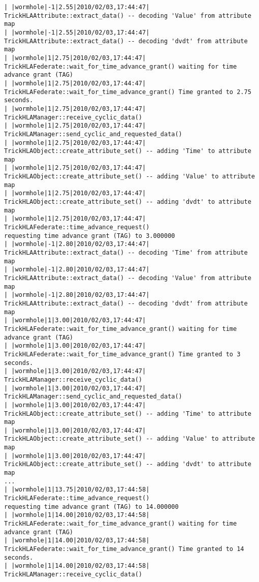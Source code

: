 \begin{lstlisting}[numbers=none,caption={output showing conditionally sent cyclic data}]
| |wormhole|-1|2.55|2010/02/03,17:44:47| TrickHLAAttribute::extract_data() -- decoding 'Value' from attribute map
| |wormhole|-1|2.55|2010/02/03,17:44:47| TrickHLAAttribute::extract_data() -- decoding 'dvdt' from attribute map
| |wormhole|1|2.75|2010/02/03,17:44:47| TrickHLAFederate::wait_for_time_advance_grant() waiting for time advance grant (TAG)
| |wormhole|1|2.75|2010/02/03,17:44:47| TrickHLAFederate::wait_for_time_advance_grant() Time granted to 2.75 seconds.
| |wormhole|1|2.75|2010/02/03,17:44:47| TrickHLAManager::receive_cyclic_data()
| |wormhole|1|2.75|2010/02/03,17:44:47| TrickHLAManager::send_cyclic_and_requested_data()
| |wormhole|1|2.75|2010/02/03,17:44:47| TrickHLAObject::create_attribute_set() -- adding 'Time' to attribute map
| |wormhole|1|2.75|2010/02/03,17:44:47| TrickHLAObject::create_attribute_set() -- adding 'Value' to attribute map
| |wormhole|1|2.75|2010/02/03,17:44:47| TrickHLAObject::create_attribute_set() -- adding 'dvdt' to attribute map
| |wormhole|1|2.75|2010/02/03,17:44:47| TrickHLAFederate::time_advance_request()   
requesting time advance grant (TAG) to 3.000000
| |wormhole|-1|2.80|2010/02/03,17:44:47| TrickHLAAttribute::extract_data() -- decoding 'Time' from attribute map
| |wormhole|-1|2.80|2010/02/03,17:44:47| TrickHLAAttribute::extract_data() -- decoding 'Value' from attribute map
| |wormhole|-1|2.80|2010/02/03,17:44:47| TrickHLAAttribute::extract_data() -- decoding 'dvdt' from attribute map
| |wormhole|1|3.00|2010/02/03,17:44:47| TrickHLAFederate::wait_for_time_advance_grant() waiting for time advance grant (TAG)
| |wormhole|1|3.00|2010/02/03,17:44:47| TrickHLAFederate::wait_for_time_advance_grant() Time granted to 3 seconds.
| |wormhole|1|3.00|2010/02/03,17:44:47| TrickHLAManager::receive_cyclic_data()
| |wormhole|1|3.00|2010/02/03,17:44:47| TrickHLAManager::send_cyclic_and_requested_data()
| |wormhole|1|3.00|2010/02/03,17:44:47| TrickHLAObject::create_attribute_set() -- adding 'Time' to attribute map
| |wormhole|1|3.00|2010/02/03,17:44:47| TrickHLAObject::create_attribute_set() -- adding 'Value' to attribute map
| |wormhole|1|3.00|2010/02/03,17:44:47| TrickHLAObject::create_attribute_set() -- adding 'dvdt' to attribute map
...
| |wormhole|1|13.75|2010/02/03,17:44:58| TrickHLAFederate::time_advance_request()   
requesting time advance grant (TAG) to 14.000000
| |wormhole|1|14.00|2010/02/03,17:44:58| TrickHLAFederate::wait_for_time_advance_grant() waiting for time advance grant (TAG)
| |wormhole|1|14.00|2010/02/03,17:44:58| TrickHLAFederate::wait_for_time_advance_grant() Time granted to 14 seconds.
| |wormhole|1|14.00|2010/02/03,17:44:58| TrickHLAManager::receive_cyclic_data()

\end{lstlisting}

